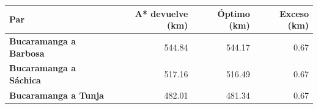 \renewcommand{\arraystretch}{1.2}
\begin{tabular}{|l|r|r|r|}
\hline
\rowcolor{gray!20} \textbf{Par} & \textbf{A* devuelve (km)} & \textbf{Óptimo (km)} & \textbf{Exceso (km)} \\
\hline
\textbf{Bucaramanga a Barbosa} & 544.84 & 544.17 & 0.67 \\
\hline
\textbf{Bucaramanga a Sáchica} & 517.16 & 516.49 & 0.67 \\
\hline
\textbf{Bucaramanga a Tunja} & 482.01 & 481.34 & 0.67 \\
\hline
\end{tabular}

